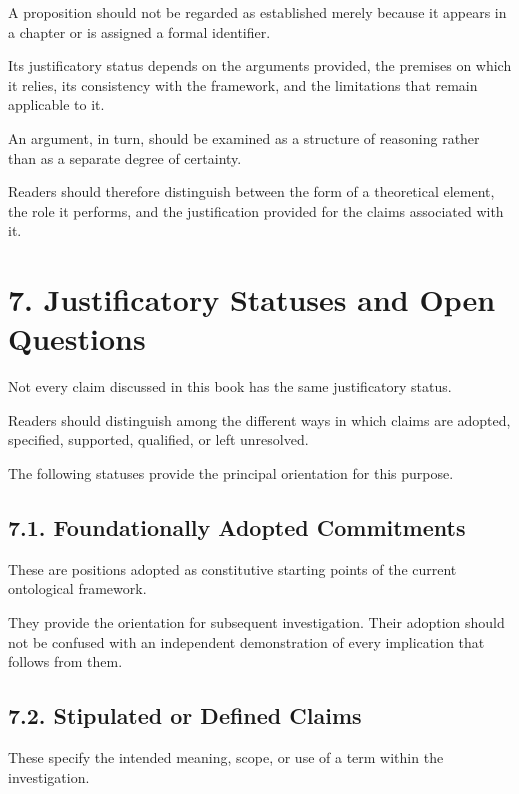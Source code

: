 A proposition should not be regarded
as established merely because it appears
in a chapter or is assigned a formal
identifier.

Its justificatory status depends on the
arguments provided, the premises on
which it relies, its consistency with
the framework, and the limitations
that remain applicable to it.

An argument, in turn, should be examined
as a structure of reasoning rather than
as a separate degree of certainty.

Readers should therefore distinguish
between the form of a theoretical element,
the role it performs, and the justification
provided for the claims associated with it.


\section*{7. Justificatory Statuses and Open Questions}

Not every claim discussed in this book
has the same justificatory status.

Readers should distinguish among the
different ways in which claims are adopted,
specified, supported, qualified, or left
unresolved.

The following statuses provide the
principal orientation for this purpose.

\subsection*{7.1. Foundationally Adopted Commitments}

These are positions adopted as constitutive
starting points of the current ontological
framework.

They provide the orientation for subsequent
investigation. Their adoption should not
be confused with an independent demonstration
of every implication that follows from them.

\subsection*{7.2. Stipulated or Defined Claims}

These specify the intended meaning,
scope, or use of a term within the
investigation.

